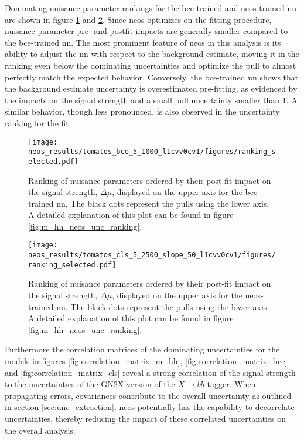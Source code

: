 Dominating nuisance parameter rankings for the \ac{bce}-trained and neos-trained \ac{nn} are shown in figure \ref{fig:neos_valid_ranking_bce} and \ref{fig:neos_valid_ranking_cls}. Since \ac{neos} optimizes on the fitting procedure, nuisance parameter pre- and postfit impacts are generally smaller compared to the \ac{bce}-trained \ac{nn}. The most prominent feature of \ac{neos} in this analysis is its ability to adjust the \ac{nn} with respect to the background estimate, moving it in the ranking even below the dominating uncertainties and optimize the pull to almost perfectly match the expected behavior. Conversely, the \ac{bce}-trained \ac{nn} shows that the background estimate uncertainty is overestimated pre-fitting, as evidenced by the impacts on the signal strength and a small pull uncertainty smaller than 1. A similar behavior, though less pronounced, is also observed in the uncertainty ranking for the \mhh fit.

\begin{figure}
    \centering
    \texttt{[image: neos\_results/tomatos\_bce\_5\_1000\_l1cvv0cv1/figures/ranking\_selected.pdf]}
    \caption[]{Ranking of nuisance parameters ordered by their post-fit impact on the signal strength, $\Delta\mu$, displayed on the upper axis for the \ac{bce}-trained \ac{nn}. The black dots represent the pulls using the lower axis. A detailed explanation of this plot can be found in figure \ref{fig:m_hh_neos_unc_ranking}.}
    \label{fig:neos_valid_ranking_bce}
\end{figure}
\begin{figure}
    \centering
    \texttt{[image: neos\_results/tomatos\_cls\_5\_2500\_slope\_50\_l1cvv0cv1/figures/ranking\_selected.pdf]}
    \caption[]{Ranking of nuisance parameters ordered by their post-fit impact on the signal strength, $\Delta\mu$, displayed on the upper axis for the \ac{neos}-trained \ac{nn}. The black dots represent the pulls using the lower axis. A detailed explanation of this plot can be found in figure \ref{fig:m_hh_neos_unc_ranking}.}
    \label{fig:neos_valid_ranking_cls}
\end{figure}

Furthermore the correlation matrices of the dominating uncertainties for the models in figures \ref{fig:correlation_matrix_m_hh}, \ref{fig:correlation_matrix_bce} and \ref{fig:correlation_matrix_cls} reveal a strong correlation of the signal strength to the uncertainties of the GN2X version of the $X\rightarrow bb$ tagger. When propagating errors, covariances contribute to the overall uncertainty as outlined in section \ref{sec:unc_extraction}. \ac{neos} potentially has the capability to decorrelate uncertainties, thereby reducing the impact of these correlated uncertainties on the overall analysis.

